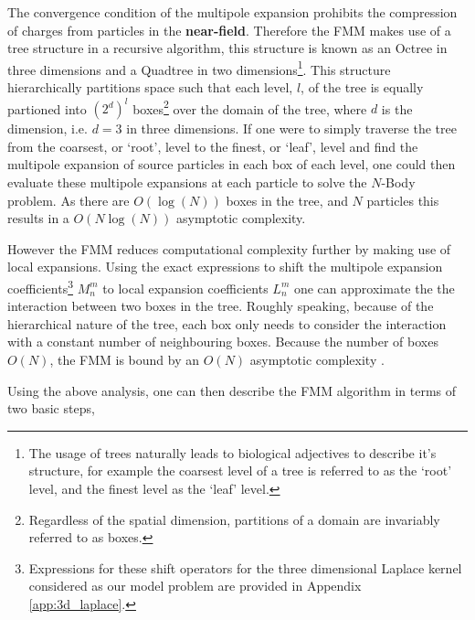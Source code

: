 The convergence condition of the multipole expansion prohibits the compression
of charges from particles in the \textbf{\gls{near-field}}. Therefore the FMM
makes use of a tree structure in a recursive algorithm, this structure is known
as an Octree in three dimensions and a Quadtree in two dimensions\footnote{The usage
of trees naturally leads to biological adjectives to describe it's structure, for example
the coarsest level of a tree is referred to as the `root' level, and the finest
level as the `leaf' level.}. This structure
hierarchically partitions space such that each level, $l$, of the tree is equally partioned into
$(2^d)^l$ boxes\footnote{Regardless of the spatial dimension, partitions of a domain are invariably
referred to as boxes.} over the domain of the tree, where $d$ is the dimension,
i.e. $d=3$ in three dimensions. If one were to simply traverse the tree from
the coarsest, or `root', level to the finest, or `leaf', level and find the multipole expansion of source
particles in each box of each level, one could then evaluate these multipole expansions
at each particle to solve the $N$-Body problem. As there are $O(\log(N))$
boxes in the tree, and $N$ particles this results in a $O(N\log(N))$ asymptotic
complexity.

However the FMM reduces computational complexity further by making use of local
expansions. Using the exact expressions to shift the multipole expansion
coefficients\footnote{Expressions for these shift operators for the three dimensional
Laplace kernel considered as our model problem are provided in Appendix \ref{app:3d_laplace}.}
$M_n^m$ to local expansion coefficients $L_n^m$ one can approximate the the interaction
between two boxes in the tree. Roughly speaking, because of the hierarchical
nature of the tree, each box only needs to consider the interaction with a
constant number of neighbouring boxes. Because the number of boxes $O(N)$,
the FMM is bound by an $O(N)$ asymptotic complexity \cite{Hwu:2011:MKP}.

Using the above analysis, one can then describe the FMM algorithm in terms of
two basic steps,

